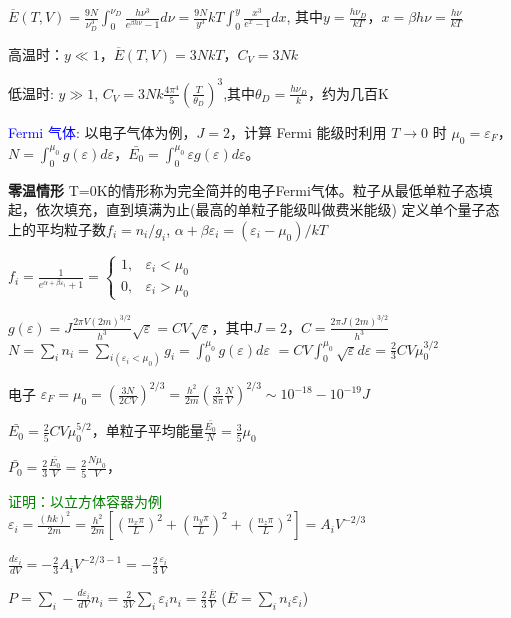 \documentclass[a4paper,8pt]{extarticle} %
\newcommand{\bluetext}[1]{\textcolor{blue}{#1}}
\newcommand{\greentext}[1]{\textcolor{green}{#1}}
\begin{document}
\begin{multicols}{3}
$\overline{E}(T,V) = \frac{9N}{\nu_D^3}\int_0^{\nu_D}\frac{h\nu^3}{e^{\beta h\nu}-1}d\nu = \frac{9N}{y^3}kT\int_0^y\frac{x^3}{e^x-1}dx$, 
其中$y = \frac{h\nu_D}{kT}$，$x = \beta h\nu =\frac{h\nu}{kT}$

高温时：$y \ll 1$，$\overline{E}(T,V) = 3NkT$，$C_V = 3Nk$

低温时: $y \gg 1$, $C_V = 3Nk\frac{4\pi^4}{5}(\frac{T}{\theta_D})^3$,其中$\theta_D = \frac{h\nu_D}{k}$，约为几百K

\bluetext{Fermi 气体}: 以电子气体为例，$J = 2$，计算 Fermi 能级时利用 $T \to 0$ 时 $\mu_0 = \varepsilon_F$，$N = \int_0^{\mu_0}g(\varepsilon)d\varepsilon$，$\bar{E_0} = \int_0^{\mu_0}\varepsilon g(\varepsilon)d\varepsilon$。

\textbf{零温情形}
T=0K的情形称为完全简并的电子Fermi气体。粒子从最低单粒子态填起，依次填充，直到填满为止(最高的单粒子能级叫做费米能级)
定义单个量子态上的平均粒子数$f_i=n_i/g_i$, $\alpha+\beta \varepsilon_i=(\varepsilon_i-\mu_0)/kT$

$f_i = \frac{1}{e^{\alpha+\beta\varepsilon_i}+1} = \left\{\begin{array}{ll}1, & \varepsilon_i < \mu_0\\0, & \varepsilon_i > \mu_0\end{array}\right.$

$g(\varepsilon) = J\frac{2\pi V(2m)^{3/2}}{h^3}\sqrt{\varepsilon}=CV\sqrt{\varepsilon}$，其中$J = 2$，$C = \frac{2\pi J(2m)^{3/2}}{h^3}$
$N = \sum_i n_i = \sum_{i(\varepsilon_i<\mu_0)} g_i = \int_0^{\mu_0} g(\varepsilon)d\varepsilon$
$=CV\int_0^{\mu_0} \sqrt{\varepsilon}d\varepsilon = \frac{2}{3}CV\mu_0^{3/2}$

电子 $\varepsilon_F = \mu_0 = (\frac{3N}{2CV})^{2/3} = \frac{h^2}{2m}(\frac{3}{8\pi}\frac{N}{V})^{2/3} \sim 10^{-18}-10^{-19}J$

$\bar{E_0} = \frac{2}{5}CV\mu_0^{5/2}$，单粒子平均能量$\frac{\bar{E_0}}{N} = \frac{3}{5}\mu_0$

$\bar{P_0} = \frac{2}{3}\frac{\bar{E_0}}{V} = \frac{2}{5}\frac{N\mu_0}{V}$，

\greentext{证明：以立方体容器为例}
$\varepsilon_i = \frac{(\hbar k)^2}{2m} = \frac{h^2}{2m}[(\frac{n_x\pi}{L})^2 + (\frac{n_y\pi}{L})^2 + (\frac{n_z\pi}{L})^2] = A_iV^{-2/3}$

$\frac{d\varepsilon_i}{dV} = -\frac{2}{3}A_iV^{-2/3-1} = -\frac{2}{3}\frac{\varepsilon_i}{V}$

$P = \sum_i -\frac{d\varepsilon_i}{dV}n_i = \frac{2}{3V}\sum_i\varepsilon_in_i = \frac{2}{3}\frac{\overline{E}}{V}$ ($\overline{E} = \sum_i n_i\varepsilon_i$)


\end{multicols}
\end{document}
